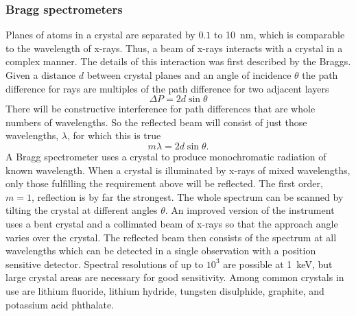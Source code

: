 \subsubsection{Bragg spectrometers}
Planes of atoms in a crystal are separated by $0.1$ to 10~nm, which
is comparable to the wavelength of x-rays. Thus, a beam of x-rays interacts with a crystal in 
a complex manner. The details of this interaction was first described by the Braggs. Given
a distance $d$ between crystal planes and an angle of incidence $\theta$ the path difference 
for rays are multiples of the path difference for two adjacent layers
\[ \Delta P=2d\sin\theta \]
There will be constructive interference for path differences that are whole numbers of wavelengths. So the reflected beam will consist of just those wavelengths, $\lambda$, 
for which this is true
\[ m\lambda=2d\sin\theta. \]
A  Bragg spectrometer uses a crystal to produce monochromatic radiation of known wavelength.
When a crystal is illuminated by x-rays of mixed wavelengths, only those fulfilling the requirement above will be reflected. The first order, $m=1$, reflection is by far the strongest.
The whole spectrum can be scanned by tilting the crystal at different angles $\theta$. An improved version of the instrument uses a bent crystal and a collimated beam of x-rays so that 
the approach angle varies over the crystal. The reflected beam then consists of the spectrum at
all wavelengths which can be detected in a single observation with a position sensitive detector. 
Spectral resolutions of up to $10^3$ are possible at 1~keV, but large crystal areas are necessary for good sensitivity.  Among common crystals in use are lithium fluoride, lithium hydride, 
tungsten disulphide, graphite, and potassium acid phthalate. 

